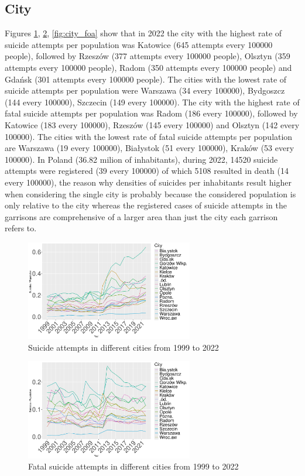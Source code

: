\documentclass{article}
\begin{document}
\subsection{City}
Figures \ref{fig:city_att}, \ref{fig:city_fat}, \ref{fig:city_foa}
show that in 2022 the city with the highest rate of suicide attempts per population
was Katowice (645 attempts every 100000 people), followed by Rzeszów (377 attempts every 100000 people),
Olsztyn (359 attempts every 100000 people), Radom (350 attempts every 100000 people)
and Gdańsk (301 attempts every 100000 people).
The cities with the lowest rate of suicide attempts per population were Warszawa
(34 every 100000), Bydgoszcz (144 every 100000), Szczecin (149 every 100000). 
The city with the highest rate of fatal suicide attempts per population
was Radom (186 every 100000), followed by Katowice (183 every 100000),  
Rzeszów (145 every 100000) and Olsztyn (142 every 100000).
The cities with the lowest rate of fatal suicide attempts per population are 
Warszawa (19 every 100000), Białystok (51 every 100000), Kraków (53 every 100000).
In Poland (36.82 milion of inhabitants), during 2022, 14520 suicide attempts were
registered (39 every 100000) of which 5108 resulted in death (14 every 100000),
the reason why densities of suicides per inhabitants result higher when considering
the single city is probably because the considered population is only relative
to the city whereas the registered cases of suicide attempts in the garrisons
are comprehensive of a larger area than just the city each garrison refers to.
\begin{figure}[H]
	\centering
		\includegraphics[width=0.65\textwidth]{imgs/city_att.pdf}
		\caption{Suicide attempts in different cities from 1999 to 2022}
		\label{fig:city_att}
\end{figure}

\begin{figure}[H]
	\centering
		\includegraphics[width=0.65\textwidth]{imgs/city_fat.pdf}
		\caption{Fatal suicide attempts in different cities from 1999 to 2022}
		\label{fig:city_fat}
\end{figure}
\end{document}
